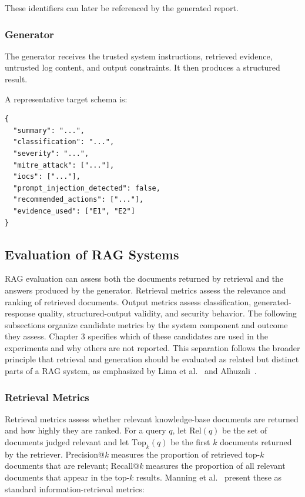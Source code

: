 These identifiers can later be referenced by the generated report.

\subsubsection{Generator}\label{generator}

The generator receives the trusted system instructions, retrieved
evidence, untrusted log content, and output constraints. It then
produces a structured result.

A representative target schema is:

\begin{lstlisting}
{
  "summary": "...",
  "classification": "...",
  "severity": "...",
  "mitre_attack": ["..."],
  "iocs": ["..."],
  "prompt_injection_detected": false,
  "recommended_actions": ["..."],
  "evidence_used": ["E1", "E2"]
}
\end{lstlisting}

\subsection{Evaluation of RAG Systems}\label{evaluation-of-rag-systems}

RAG evaluation can assess both the documents returned by retrieval and
the answers produced by the generator. Retrieval metrics assess the
relevance and ranking of retrieved documents. Output metrics assess
classification, generated-response quality, structured-output validity,
and security behavior. The following subsections organize candidate
metrics by the system component and outcome they assess. Chapter 3
specifies which of these candidates are used in the experiments and why
others are not reported. This separation follows the broader principle
that retrieval and generation should be evaluated as related but distinct
parts of a RAG system, as emphasized by Lima et al.~\cite{lima2024knowyourrag}
and Alhuzali~\cite{alhuzali2025ragintel}.

\subsubsection{Retrieval Metrics}\label{retrieval-metric-candidates}

Retrieval metrics assess whether relevant knowledge-base documents are
returned and how highly they are ranked. For a query $q$, let
$\mathrm{Rel}(q)$ be the set of documents judged relevant and let
$\mathrm{Top}_k(q)$ be the first $k$ documents returned by the retriever.
Precision@\emph{k} measures the proportion of retrieved top-$k$ documents
that are relevant; Recall@\emph{k} measures the proportion of all
relevant documents that appear in the top-$k$ results. Manning et
al.~\cite{manning2008ir} present these as standard information-retrieval
metrics:


